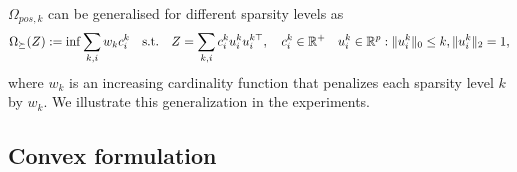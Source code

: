 $\Omega_{pos,k}$ can be generalised for different sparsity levels as
\begin{align}
\Omega_{\succeq}(Z):=\inf \sum_{k,i}w_{k}c_i^k \quad \text{s.t.} \quad Z=\sum_{k,i} c_i^k u_i^k u_{i}^{k\top}, \quad c_i^k\in \mathbb{R}^{+} \quad u_{i}^k\in\mathbb{R}^p  :   \|u_{i}^k\|_0 \leq k, \|u_{i}^k\|_2 = 1,
\end{align}
where $w_{k}$ is an increasing cardinality function that penalizes each sparsity level $k$ by $w_{k}$. We illustrate this generalization in the experiments.\\


\subsection{Convex formulation}

